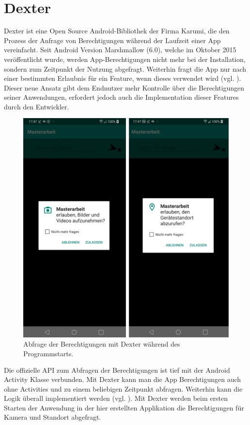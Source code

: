 \section{Dexter}

Dexter ist eine Open Source Android-Bibliothek der Firma Karumi, die den Prozess der Anfrage von Berechtigungen während der Laufzeit einer App vereinfacht. Seit Android Version Marshmallow (6.0), welche im Oktober 2015 veröffentlicht wurde, werden App-Berechtigungen nicht mehr bei der Installation, sondern zum Zeitpunkt der Nutzung abgefragt. Weiterhin fragt die App nur nach einer bestimmten Erlaubnis für ein Feature, wenn dieses verwendet wird (vgl. \cite{marshmallow}). Dieser neue Ansatz gibt dem Endnutzer mehr Kontrolle über die Berechtigungen seiner Anwendungen, erfordert jedoch auch die Implementation dieser Features durch den Entwickler. 

\begin{figure}[H]
	\centering
	\includegraphics[scale=0.14]{request.png}
	\caption{Abfrage der Berechtigungen mit Dexter während des Programmstarts.}
\end{figure} 

Die offizielle API zum Abfragen der Berechtigungen ist tief mit der Android \glqq Activity\grqq{} Klasse verbunden. Mit Dexter kann man die App Berechtigungen auch ohne Activities und zu einem beliebigen Zeitpunkt abfragen. Weiterhin kann die Logik überall implementiert werden (vgl. \cite{dexter}). Mit Dexter werden beim ersten Starten der Anwendung in der hier erstellten Applikation die Berechtigungen für Kamera und Standort abgefragt.

